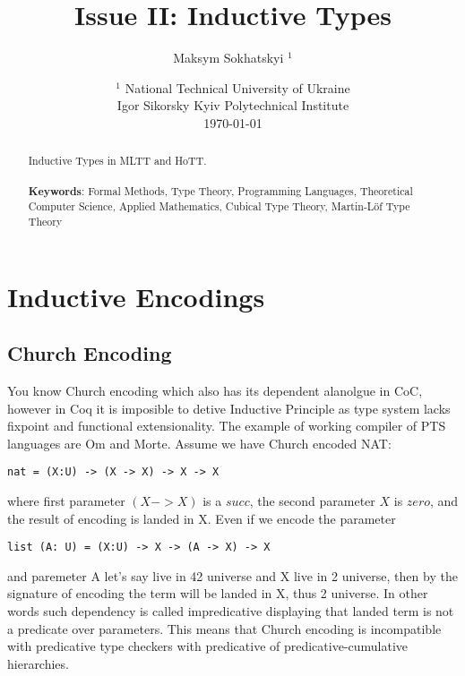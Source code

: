 \documentclass{article}
\begin{document}
\title{Issue II: Inductive Types}
\author{Maksym Sokhatskyi $^1$}
\date{ $^1$ National Technical University of Ukraine \\
       \small Igor Sikorsky Kyiv Polytechnical Institute \\
       \today }

\maketitle

\begin{abstract}

Inductive Types in MLTT and HoTT.
\\
\\
{\bf Keywords}: Formal Methods, Type Theory, Programming Languages,
          Theoretical Computer Science, Applied Mathematics,
          Cubical Type Theory, Martin-Löf Type Theory
\end{abstract}

\ifincludeTOC
  \tableofcontents
\fi

\newpage
\section{Inductive Encodings}

\subsection{Church Encoding}

You know Church encoding which also has its dependent alanolgue in CoC, however
in Coq it is imposible to detive Inductive Principle as type system lacks fixpoint
and functional extensionality. The example of working compiler of PTS languages are Om and Morte.
Assume we have Church encoded NAT:

\begin{lstlisting}[mathescape=true]
nat = (X:U) -> (X -> X) -> X -> X
\end{lstlisting}

where first parameter $(X -> X)$ is a $succ$, the second parameter $X$ is $zero$,
and the result of encoding is landed in X. Even if we encode the parameter

\begin{lstlisting}[mathescape=true]
list (A: U) = (X:U) -> X -> (A -> X) -> X
\end{lstlisting}

and paremeter A let's say live in 42 universe and X live in 2 universe, then by
the signature of encoding the term will be landed in X, thus 2 universe. In other words
such dependency is called impredicative displaying that landed term is not a predicate over parameters.
This means that Church encoding is incompatible with predicative type checkers with predicative
of predicative-cumulative hierarchies.
\end{document}
